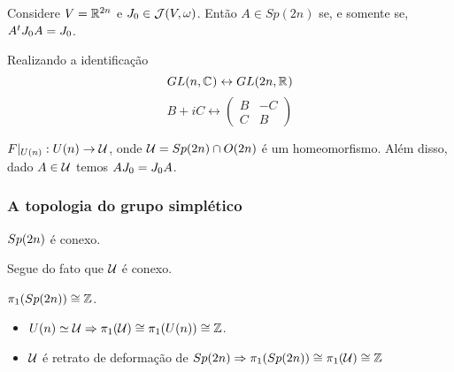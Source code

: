 \documentclass{beamer}
\begin{document}
\begin{footnotesize}
\begin{frame}
		\begin{lema}[Caracterização de $Sp(2n)$]
			 Considere $V = \mathbb{R}^{2n}$ e $J_{0} \in \mathcal{J}(V, \omega)$. Então $A\in Sp(2n)$ se, e somente se, $A^{t}J_{0} A = J_{0}$.
		\end{lema}
		
		Realizando a identificação
		$$
		GL(n, \mathbb{C}^{})\leftrightarrow GL(2n, \mathbb{R}^{})
		$$
		$$
		B+iC \leftrightarrow
		\left(
		\begin{array}{cc}
		B & -C
		\\
		C & B
		\end{array}
		\right)
		$$  
		\begin{lema}
			$F|_{U(n)}: U(n) \to \mathcal{U} $, onde $\mathcal{U}  = Sp(2n)\cap O(2n)$ é um homeomorfismo. Além disso, dado $A \in \mathcal{U} $ temos $AJ_{0}=J_{0} A$.
		\end{lema}
	\end{frame}
		
	\begin{frame}
		\frametitle{A topologia do grupo simplético}
		\begin{teorema}
			$Sp(2n)$ é conexo.
		\end{teorema}
		\begin{prova}
			Segue do fato que $\mathcal{U}$ é conexo.
		\end{prova}
		
		\begin{teorema}
			$\pi_{1}(Sp(2n)) \cong \mathbb{Z}$.
			
		\end{teorema}
		\begin{prova}\begin{itemize}
				\item $U(n) \simeq \mathcal{U} \Rightarrow \pi_{1}(\mathcal{U}) \cong \pi_{1}(U(n)) \cong \mathbb{Z}$.
				
				\item $\mathcal{U}$ é retrato de deformação de $Sp(2n) \Rightarrow \pi_{1}(Sp(2n)) \cong \pi_{1}(\mathcal{U})\cong \mathbb{Z}$
				
			\end{itemize}
		\end{prova}
	

\end{frame}
\end{footnotesize}
\end{document}
